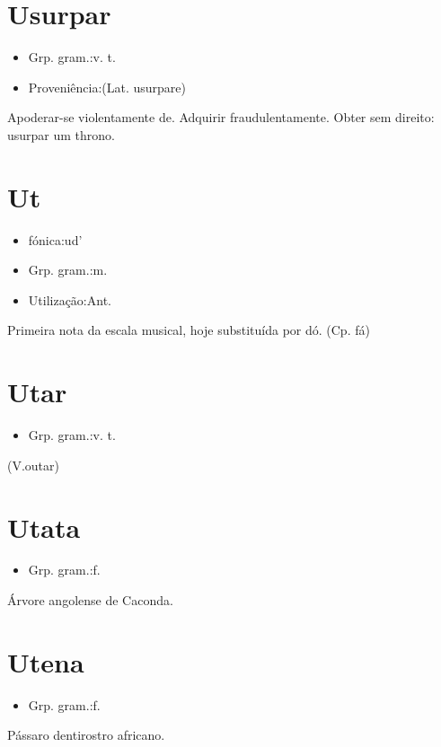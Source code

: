 \documentclass{article}
\begin{document}
\section{Usurpar}
\begin{itemize}
\item {Grp. gram.:v. t.}
\end{itemize}
\begin{itemize}
\item {Proveniência:(Lat. \textunderscore usurpare\textunderscore )}
\end{itemize}
Apoderar-se violentamente de.
Adquirir fraudulentamente.
Obter sem direito: \textunderscore usurpar um throno\textunderscore .
\section{Ut}
\begin{itemize}
\item {fónica:ud'}
\end{itemize}
\begin{itemize}
\item {Grp. gram.:m.}
\end{itemize}
\begin{itemize}
\item {Utilização:Ant.}
\end{itemize}
Primeira nota da escala musical, hoje substituída por \textunderscore dó\textunderscore .
(Cp. \textunderscore fá\textunderscore )
\section{Utar}
\begin{itemize}
\item {Grp. gram.:v. t.}
\end{itemize}
(V.outar)
\section{Utata}
\begin{itemize}
\item {Grp. gram.:f.}
\end{itemize}
Árvore angolense de Caconda.
\section{Utena}
\begin{itemize}
\item {Grp. gram.:f.}
\end{itemize}
Pássaro dentirostro africano.
\end{document}
